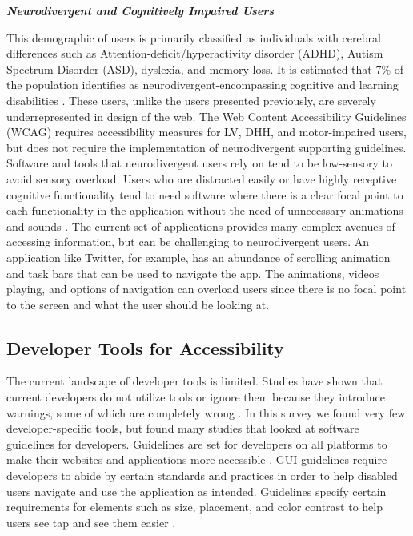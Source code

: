 \noindent \textbf{\textit{Neurodivergent and Cognitively Impaired Users}}

This demographic of users is primarily classified as individuals with cerebral differences such as Attention-deficit/hyperactivity disorder (ADHD), Autism Spectrum Disorder (ASD), dyslexia, and memory loss. It is estimated that 7\% of the population identifies as neurodivergent-encompassing cognitive and learning disabilities \cite{48}. These users, unlike the users presented previously, are severely underrepresented in design of the web. The Web Content Accessibility Guidelines (WCAG) \cite{49} requires accessibility measures for LV, DHH, and motor-impaired users, but does not require the implementation of neurodivergent supporting guidelines. Software and tools that neurodivergent users rely on tend to be low-sensory to avoid sensory overload. Users who are distracted easily or have highly receptive cognitive functionality tend to need software where there is a clear focal point to each functionality in the application without the need of unnecessary animations and sounds \cite{50}. The current set of applications provides many complex avenues of accessing information, but can be challenging to neurodivergent users. An application like Twitter, for example, has an abundance of scrolling animation and task bars that can be used to navigate the app. The animations, videos playing, and options of navigation can overload users since there is no focal point to the screen and what the user should be looking at. 

\subsection{Developer Tools for Accessibility}

The current landscape of developer tools is limited. Studies have shown that current developers do not utilize tools or ignore them because they introduce warnings, some of which are completely wrong \cite{9}. In this survey we found very few developer-specific tools, but found many studies that looked at software guidelines for developers. Guidelines are set for developers on all platforms to make their websites and applications more accessible \cite{25,26,38,18}. GUI guidelines require developers to abide by certain standards and practices in order to help disabled users navigate and use the application as intended. Guidelines specify certain requirements for elements such as size, placement, and color contrast to help users see tap and see them easier \cite{25,26}.


